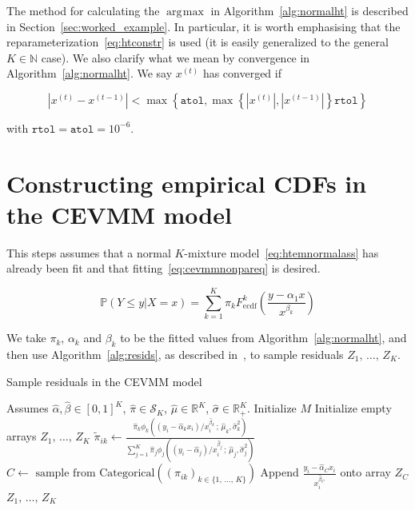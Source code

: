 \documentclass[11pt,twoside,openany]{book}
\newcommand{\code}[1]{\texttt{#1}}
\newcommand{\p}{\mathbb{P}}
\newcommand{\reals}{\mathbb{R}}
\DeclareMathOperator*{\argmax}{arg\!max}
\numberwithin{Theorem}{chapter}
\numberwithin{Definition}{chapter}
\numberwithin{Lemma}{chapter}
\numberwithin{Algorithm}{chapter}
\numberwithin{equation}{chapter}
\begin{document}
The method for calculating the $\argmax$ in Algorithm~\ref{alg:normalht} is
described in Section~\ref{sec:worked_example}. In particular, it is worth
emphasising that the reparameterization~\eqref{eq:htconstr} is used (it is easily
generalized to the general $K\in\mathbb{N}$ case). We also clarify what we mean
by convergence in Algorithm~\ref{alg:normalht}. We say $x^{(t)}$ has converged
if

\[
  \left|x^{(t)} - x^{(t-1)}\right| < \max\left\{\code{atol},\max\left\{\left|x^{(t)}\right|,\left|x^{(t-1)}\right|\right\} \code{rtol}\right\}
\]

with $\code{rtol}=\code{atol}=10^{-6}$.


\section{Constructing empirical CDFs in the CEVMM model}
\label{appendix:nonparametriccevmm}

This steps assumes that a normal $K$-mixture model~\eqref{eq:htemnormalass} has already been fit
and that fitting~\eqref{eq:cevmmnonpareq} is desired.


\begin{equation}\label{eq:cevmmnonpareq}
  \p\left(Y\leq y | X =x\right) = \sum_{k=1}^K
  \pi_k F^k_{\text{ecdf}}\left(\frac{y - \alpha_1 x}{x^{\beta_k}}\right)
\end{equation}

We take $\pi_k$, $\alpha_k$ and $\beta_k$ to be the fitted values from Algorithm~\ref{alg:normalht},
and then use Algorithm~\ref{alg:resids}, as described in~\cite{tendijck2021modeling}, to sample
residuals $Z_1,\,\ldots,\,Z_K$.

\begin{algorithm}
\caption{Sample residuals in the CEVMM model\label{alg:resids}}
\begin{algorithmic}
\State Assumes $\hat\alpha,\hat\beta\in[0,1]^K$, $\hat\pi\in\mathcal{S}_K$, $\hat\mu\in\reals^K$, $\hat\sigma\in\reals_{+}^K$.
\State Initialize $M$
\State Initialize empty arrays $Z_1,\,\ldots,\,Z_K$
    \State $\tilde\pi_{ik}  \gets \frac{\hat\pi_k \phi_k\left((y_i -  \hat\alpha_kx_i)/x_i^{\hat\beta_k}\,;\,\hat\mu_k,\hat\sigma^2_k\right)}{\sum_{j=1}^K\hat\pi_j
    \phi_j\left((y_i -  \hat\alpha_j)/x_i^{\hat\beta_j}\,;\,\hat\mu_j,\hat\sigma_j^2\right)}$
    \EndFor
  \EndFor
    \State $C \gets \text{ sample from Categorical}\left((\pi_{ik})_{k\in\{1,\,\ldots,\, K\}}\right)$
    \State Append $\frac{y_i - \hat\alpha_C x_i}{x_i^{\hat\beta_C}}$ onto array $Z_C$
    \EndFor
  \EndFor
\State \Return $Z_1,\,\ldots,\,Z_K$
\end{algorithmic}
\end{algorithm}
\end{document}
